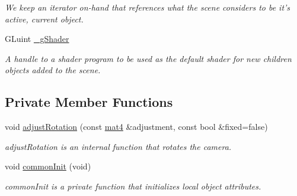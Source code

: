 \begin{DoxyCompactItemize}
\begin{DoxyCompactList}\small\item\em We keep an iterator on-\/hand that references what the scene considers to be it's active, current object. \end{DoxyCompactList}\item 
\hypertarget{class_scene_a8f9bdd8ec5edb1f414fbd314a36e2724}{G\-Luint \hyperlink{class_scene_a8f9bdd8ec5edb1f414fbd314a36e2724}{\-\_\-g\-Shader}}\label{class_scene_a8f9bdd8ec5edb1f414fbd314a36e2724}

\begin{DoxyCompactList}\small\item\em A handle to a shader program to be used as the default shader for new children objects added to the scene. \end{DoxyCompactList}\end{DoxyCompactItemize}
\subsection*{Private Member Functions}
\begin{DoxyCompactItemize}
\item 
void \hyperlink{class_camera_aba32f195cdb5bfcfd05c2ce74315b6c3}{adjust\-Rotation} (const \hyperlink{class_angel_1_1mat4}{mat4} \&adjustment, const bool \&fixed=false)
\begin{DoxyCompactList}\small\item\em adjust\-Rotation is an internal function that rotates the camera. \end{DoxyCompactList}\item 
void \hyperlink{class_camera_a20243a7e3eb06ab1265118c5fb9cce9b}{common\-Init} (void)
\begin{DoxyCompactList}\small\item\em common\-Init is a private function that initializes local object attributes. \end{DoxyCompactList}\end{DoxyCompactItemize}
